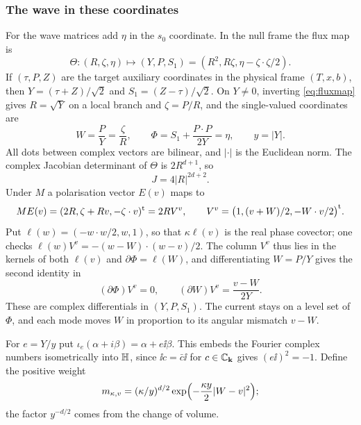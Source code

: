 \subsubsection*{The wave in these coordinates}
For the wave matrices add $\eta$ in the $s_0$ coordinate. In the null frame the flux map is
\begin{equation}\label{eq:fluxmap}
\Theta:(R,\zeta,\eta)\longmapsto(Y,P,S_1)=(R^2,R\zeta,\eta-\zeta\cdot\zeta/2).
\end{equation}
If $(\tau,P,Z)$ are the target auxiliary coordinates in the physical frame $(T,x,b)$, then
$Y=(\tau+Z)/\sqrt2$ and $S_1=(Z-\tau)/\sqrt2$. On $Y\ne0$, inverting \eqref{eq:fluxmap} gives
$R=\sqrt Y$ on a local branch and $\zeta=P/R$, and the single-valued coordinates are
\begin{equation}\label{eq:WPhi}
W=\frac PY=\frac\zeta R,\qquad\Phi=S_1+\frac{P\cdot P}{2Y}=\eta,\qquad y=|Y| .
\end{equation}
All dots between complex vectors are bilinear, and $|\cdot|$ is the Euclidean norm. The complex
Jacobian determinant of $\Theta$ is $2R^{d+1}$, so
\begin{equation}\label{eq:jacobian}
J=4|R|^{2d+2}.
\end{equation}
Under $M$ a polarisation vector $E(v)$ maps to
\begin{equation}\label{eq:Vv}
ME(v)=(2R,\zeta+Rv,-\zeta\cdot v)^{\rm t}=2RV^v,\qquad V^v=\bigl(1,(v+W)/2,-W\cdot v/2\bigr)^{\rm t}.
\end{equation}
Put $\ell(w)=(-w\cdot w/2,w,1)$, so that $\kappa\ell(v)$ is the real phase covector; one checks
$\ell(w)V^v=-(w-W)\cdot(w-v)/2$. The column $V^v$ thus lies in the kernels of both $\ell(v)$ and
$\partial\Phi=\ell(W)$, and differentiating $W=P/Y$ gives the second identity in
\begin{equation}\label{eq:tangency}
(\partial\Phi)V^v=0,\qquad(\partial W)V^v=\frac{v-W}{2Y} .
\end{equation}
These are complex differentials in $(Y,P,S_1)$. The current stays on a level set of $\Phi$,
and each mode moves $W$ in proportion to its angular mismatch $v-W$.

For $e=Y/y$ put $\iota_e(\alpha+i\beta)=\alpha+e\ii\beta$. This embeds the Fourier complex
numbers isometrically into $\mathbb{H}$, since $\ii c=\bar c\ii$ for $c\in\mathbb{C}_{\mathbf k}$ gives $(e\ii)^2=-1$.
Define the positive weight
\[
m_{\kappa,v}=(\kappa/y)^{d/2}\exp\Bigl(-\frac{\kappa y}2|W-v|^2\Bigr);
\]
the factor $y^{-d/2}$ comes from the change of volume.

